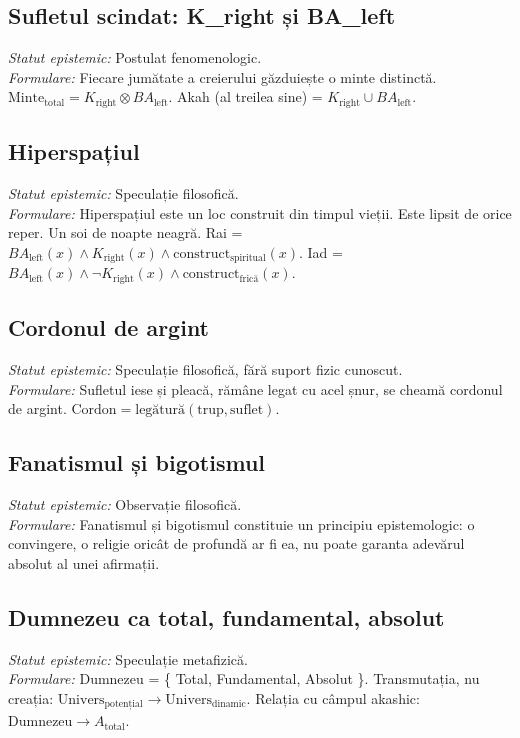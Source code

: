 \documentclass[11pt,a4paper]{article}
\begin{document}
\subsection{Sufletul scindat: K\_right și BA\_left}
\textit{Statut epistemic:} Postulat fenomenologic. \\
\textit{Formulare:} Fiecare jumătate a creierului găzduiește o minte distinctă. $\text{Minte}_{\text{total}} = K_{\text{right}} \otimes BA_{\text{left}}$. Akah (al treilea sine) = $K_{\text{right}} \cup BA_{\text{left}}$.

\subsection{Hiperspațiul}
\textit{Statut epistemic:} Speculație filosofică. \\
\textit{Formulare:} Hiperspațiul este un loc construit din timpul vieții. Este lipsit de orice reper. Un soi de noapte neagră. Rai = $BA_{\text{left}}(x) \land K_{\text{right}}(x) \land \text{construct}_{\text{spiritual}}(x)$. Iad = $BA_{\text{left}}(x) \land \neg K_{\text{right}}(x) \land \text{construct}_{\text{frică}}(x)$.

\subsection{Cordonul de argint}
\textit{Statut epistemic:} Speculație filosofică, fără suport fizic cunoscut. \\
\textit{Formulare:} Sufletul iese și pleacă, rămâne legat cu acel șnur, se cheamă cordonul de argint. $\text{Cordon} = \text{legătură}(\text{trup}, \text{suflet})$.

\subsection{Fanatismul și bigotismul}
\textit{Statut epistemic:} Observație filosofică. \\
\textit{Formulare:} Fanatismul și bigotismul constituie un principiu epistemologic: o convingere, o religie oricât de profundă ar fi ea, nu poate garanta adevărul absolut al unei afirmații.

\subsection{Dumnezeu ca total, fundamental, absolut}
\textit{Statut epistemic:} Speculație metafizică. \\
\textit{Formulare:} Dumnezeu = \{ Total, Fundamental, Absolut \}. Transmutația, nu creația: $\text{Univers}_{\text{potențial}} \to \text{Univers}_{\text{dinamic}}$. Relația cu câmpul akashic: $\text{Dumnezeu} \to A_{\text{total}}$.
\end{document}
